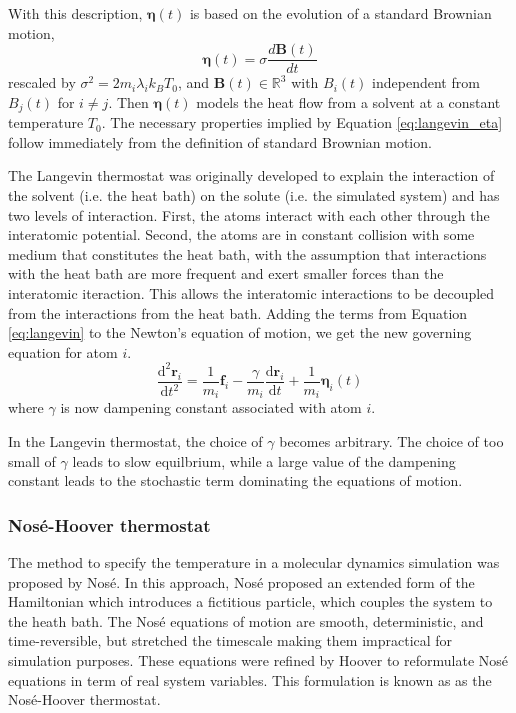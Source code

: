 With this description, $\bm{\eta}(t)$ is based on the evolution of a standard Brownian motion,
\begin{equation}
  \bm{\eta}(t) = \sigma \frac{d\bm{B}(t)}{dt}
\end{equation}
rescaled by $\sigma^2 = 2 m_i \lambda_i k_B T_0$, and $\bm{B}(t) \in \mathbb{R}^3$ with $B_i(t)$ independent from $B_j(t)$ for $i \neq j$.  Then $\bm{\eta}(t)$ models the heat flow from a solvent at a constant temperature $T_0$.  The necessary properties implied by Equation \ref{eq:langevin_eta} follow immediately from the definition of standard Brownian motion.

The Langevin thermostat\cite{grest1986_langevin} was originally developed to explain the interaction of the solvent (i.e. the heat bath) on the solute (i.e. the simulated system) and has two levels of interaction.  First, the atoms interact with each other through the interatomic potential.  Second, the atoms are in constant collision with some medium that constitutes the heat bath, with the assumption that interactions with the heat bath are more frequent and exert smaller forces than the interatomic iteraction.  This allows the  interatomic interactions to be decoupled from the interactions from the heat bath.  Adding the terms from Equation \ref{eq:langevin} to the Newton's equation of motion, we get the new governing equation for atom $i$.
\begin{equation}
  \label{eq:langevin_eos}
  \frac{\mathrm{d}^2 \bm{r}_i}
	     {\mathrm{d} t^2}
  =
  \frac{1}{m_i} \bm{f}_i
  - \frac{\gamma}
	       {m_i}
	  \frac{\mathrm{d} \bm{r}_i}
		     {\mathrm{d} t}
  + \frac{1}{m_i} \bm{\eta}_i(t)
\end{equation}
where $\gamma$ is now dampening constant associated with atom $i$.

In the Langevin thermostat, the choice of $\gamma$ becomes arbitrary.  The choice of too small of $\gamma$ leads to slow equilbrium, while a large value of the dampening constant leads to the stochastic term dominating the equations of motion.

\subsubsection{Nos\'e-Hoover thermostat}
The method to specify the temperature in a molecular dynamics simulation was proposed by Nos\'e\cite{nose1984_npt_1,nose1984_npt_2}.  In this approach, Nos\'e proposed an extended form of the Hamiltonian which introduces a fictitious particle, which couples the system to the heath bath.  The Nos\'e equations of motion are smooth, deterministic, and time-reversible, but stretched the timescale making them impractical for simulation purposes.  These equations were refined by Hoover\cite{hoover1985_npt} to reformulate Nos\'e equations in term of real system variables.  This formulation is known as as the Nos\'e-Hoover thermostat.

